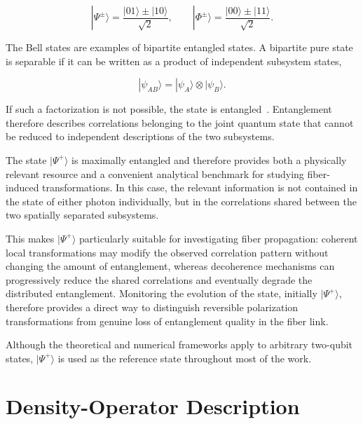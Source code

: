 \begin{equation}
|\Psi^{\pm}\rangle
=
\frac{|01\rangle\pm|10\rangle}{\sqrt{2}},
\qquad
|\Phi^{\pm}\rangle
=
\frac{|00\rangle\pm|11\rangle}{\sqrt{2}}.
\label{eq:bell_state_basis}
\end{equation}

The Bell states are examples of bipartite entangled states. A bipartite pure
state is separable if it can be written as a product of independent subsystem
states,

\begin{equation}
|\psi_{AB}\rangle
=
|\psi_A\rangle
\otimes
|\psi_B\rangle.
\label{eq:pure_state_separability}
\end{equation}

If such a factorization is not possible, the state is entangled~\cite{nielsen_chuang_qcqi}. 
Entanglement therefore describes correlations
belonging to the joint quantum state that cannot be reduced to independent
descriptions of the two subsystems.

The state \( |\Psi^{+}\rangle \) is maximally entangled and therefore provides both
a physically relevant resource and a convenient analytical benchmark for studying
fiber-induced transformations. In this case, the relevant information is not
contained in the state of either photon individually, but in the correlations
shared between the two spatially separated subsystems.

This makes \( |\Psi^{+}\rangle \) particularly suitable for investigating fiber
propagation: coherent local transformations may modify the observed correlation
pattern without changing the amount of entanglement, whereas decoherence
mechanisms can progressively reduce the shared correlations and eventually degrade
the distributed entanglement. Monitoring the evolution of the state, initially \( |\Psi^{+}\rangle \),
therefore provides a direct way to distinguish reversible polarization
transformations from genuine loss of entanglement quality in the fiber link.

Although the theoretical and numerical frameworks apply to arbitrary two-qubit states,
\( |\Psi^{+}\rangle \) is used as the reference state throughout most of the work.


\section{Density-Operator Description}
\label{sec:density_operator_description}

